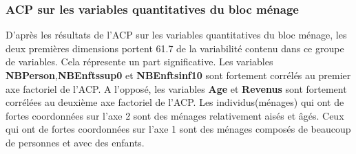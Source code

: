 \documentclass[11pt,a4paper, x11names]{article}\usepackage[]{graphicx}\usepackage[]{color}
\makeatletter
\newenvironment{kframe}{%
 \def\at@end@of@kframe{}%
 \ifinner\ifhmode%
  \def\at@end@of@kframe{\end{minipage}}%
  \begin{minipage}{\columnwidth}%
 \fi\fi%
 \def\FrameCommand##1{\hskip\@totalleftmargin \hskip-\fboxsep
 \colorbox{shadecolor}{##1}\hskip-\fboxsep
     \hskip-\linewidth \hskip-\@totalleftmargin \hskip\columnwidth}%
 \MakeFramed {\advance\hsize-\width
   \@totalleftmargin\z@ \linewidth\hsize
   \@setminipage}}%
 {\par\unskip\endMakeFramed%
 \at@end@of@kframe}
\newenvironment{knitrout}{}{} %
\makeatother
\begin{document}
\subsubsection{ACP sur les variables quantitatives du bloc ménage}
\begin{minipage}{0.49\linewidth}
\begin{mdframed}
\begin{knitrout}
\color{fgcolor}\begin{kframe}


{\ttfamily\noindent\bfseries\color{errorcolor}{\#\# Error in .get\_facto\_class(X): objet 'res.pca\_habitude' introuvable}}\end{kframe}
\end{knitrout}
\end{mdframed}
\end{minipage}
\hfill
\begin{minipage}{0.49\linewidth}
\begin{mdframed}
\begin{knitrout}
\color{fgcolor}\begin{kframe}


{\ttfamily\noindent\bfseries\color{errorcolor}{\#\# Error in .get\_facto\_class(X): objet 'res.pca\_habitude' introuvable}}\end{kframe}
\end{knitrout}
\end{mdframed}
\end{minipage}

D'après les résultats de l'ACP sur les variables quantitatives du bloc ménage,
les deux premières dimensions portent 61.7 de la variabilité contenu dans ce groupe de variables. Cela répresente un part significative. Les variables \textbf{NBPerson},\textbf{NBEnftssup0} et \textbf{NBEnftsinf10} sont fortement corrélés au premier axe factoriel de l'ACP. A l'opposé, les variables  \textbf{Age} et \textbf{Revenus} sont fortement corrélées au deuxième axe factoriel de l'ACP. Les individus(ménages) qui ont de fortes coordonnées sur l'axe 2 sont des ménages relativement aisés et âgés. Ceux qui ont de fortes coordonnées sur l'axe 1 sont des ménages composés de beaucoup de personnes et avec des enfants.
\end{document}

